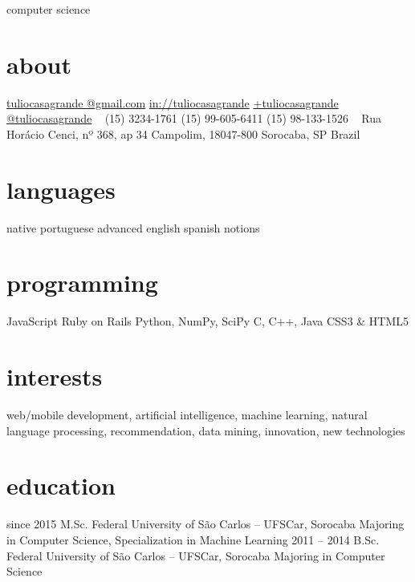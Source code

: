 \documentclass[]{friggeri-cv}
\begin{document}
       {computer science}


\begin{aside}
  \section{about}
    \href{mailto:tuliocasagrande@gmail.com}{tuliocasagrande @gmail.com}
    \href{http://www.linkedin.com/in/tuliocasagrande}{in://tuliocasagrande}
    \href{https://plus.google.com/+tuliocasagrande}{+tuliocasagrande}
    \href{https://twitter.com/tuliocasagrande}{@tuliocasagrande}
    ~
    (15) 3234-1761
    (15) 99-605-6411
    (15) 98-133-1526
    ~
    Rua Horácio Cenci,
    nº 368, ap 34
    Campolim, 18047-800
    Sorocaba, SP
    Brazil
  \section{languages}
    native portuguese
    advanced english
    spanish notions
  \section{programming}
    JavaScript
    Ruby on Rails
    Python, NumPy, SciPy
    C, C++, Java
    CSS3 \& HTML5
\end{aside}

\section{interests}

web/mobile development, artificial intelligence, machine learning, natural language processing, recommendation, data mining, innovation, new technologies

\section{education}

\begin{entrylist}
  \entry
   {since 2015}
   {M.Sc.}
   {Federal University of São Carlos -- UFSCar, Sorocaba}
   {Majoring in Computer Science, Specialization in Machine Learning}
  \entry
    {2011 – 2014}
    {B.Sc.}
    {Federal University of São Carlos -- UFSCar, Sorocaba}
    {Majoring in Computer Science}
\end{entrylist}
\end{document}
